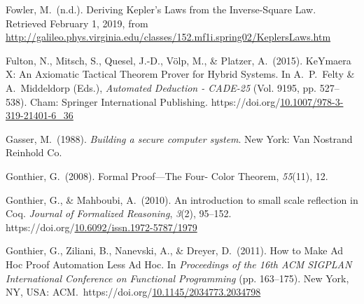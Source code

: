 \documentclass[12pt,twoside]{article}
\begin{document}
{\begin{thebibliography}{222}
\mdbibitemlabel{}Fowler, M.~(n.d.). Deriving Kepler’s Laws from the Inverse-Square Law. Retrieved February 1, 2019, from \href{http://galileo.phys.virginia.edu/classes/152.mf1i.spring02/KeplersLaws.htm}{{\ttfamily http://\hspace{0pt}galileo.\hspace{0pt}phys.\hspace{0pt}virginia.\hspace{0pt}edu/\hspace{0pt}classes/\hspace{0pt}152.\hspace{0pt}mf1i.\hspace{0pt}spring02/\hspace{0pt}KeplersLaws.\hspace{0pt}htm}}\label{fowler_deriving_nodate}%

\mdbibitemlabel{}Fulton, N., Mitsch, S., Quesel, J.-D., Völp, M., \& Platzer, A.~(2015). KeYmaera X: An Axiomatic Tactical Theorem Prover for Hybrid Systems. In A.~P.~Felty \& A.~Middeldorp (Eds.), \emph{Automated Deduction - CADE-25} (Vol. 9195, pp. 527–538). Cham: Springer International Publishing. https://doi.org/\href{https://dx.doi.org/10.1007/978-3-319-21401-6_36}{10.1007/978-3-319-21401-6\_36}\label{felty_keymaera_2015}%

\mdbibitemlabel{}Gasser, M.~(1988). \emph{Building a secure computer system}. New York: Van Nostrand Reinhold Co.\label{gasser_building_1988}%

\mdbibitemlabel{}Gonthier, G.~(2008). Formal Proof—The Four- Color Theorem, \emph{55}(11), 12.\label{gonthier_formal_2008}%

\mdbibitemlabel{}Gonthier, G., \& Mahboubi, A.~(2010). An introduction to small scale reflection in Coq. \emph{Journal of Formalized Reasoning}, \emph{3}(2), 95–152. https://doi.org/\href{https://dx.doi.org/10.6092/issn.1972-5787/1979}{10.6092/issn.1972-5787/1979}\label{gonthier_introduction_2010}%

\mdbibitemlabel{}Gonthier, G., Ziliani, B., Nanevski, A., \& Dreyer, D.~(2011). How to Make Ad Hoc Proof Automation Less Ad Hoc. In \emph{Proceedings of the 16th ACM SIGPLAN International Conference on Functional Programming} (pp. 163–175). New York, NY, USA: ACM.~https://doi.org/\href{https://dx.doi.org/10.1145/2034773.2034798}{10.1145/2034773.2034798}\label{gonthier_how_2011}%


\end{thebibliography}}
\end{document}
